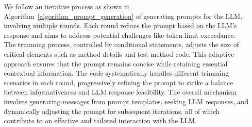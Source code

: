 We follow an iterative process as shown in Algorithm~\ref{algorithm_prompt_generation} of generating prompts for the LLM, involving multiple rounds. Each round refines the prompt based on the LLM's response and aims to address potential challenges like token limit exceedance. The trimming process, controlled by conditional statements, adjusts the size of critical elements such as method details and test method code. This adaptive approach ensures that the prompt remains concise while retaining essential contextual information. The code systematically handles different trimming scenarios in each round, progressively refining the prompt to strike a balance between informativeness and LLM response feasibility. The overall mechanism involves generating messages from prompt templates, seeking LLM responses, and dynamically adjusting the prompt for subsequent iterations, all of which contribute to an effective and tailored interaction with the LLM.

            
                
                
                
                
                

